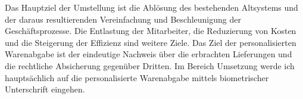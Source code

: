 Das Hauptziel der Umstellung ist die Ablösung des bestehenden Altsystems und der daraus resultierenden Vereinfachung und Beschleunigung der Geschäftsprozesse. Die Entlastung der Mitarbeiter, die Reduzierung von Kosten und die Steigerung der Effizienz sind weitere Ziele. Das Ziel der personalisierten Warenabgabe ist der eindeutige Nachweis über die erbrachten Lieferungen und die rechtliche Absicherung gegenüber Dritten. Im Bereich Umsetzung werde ich hauptsächlich auf die personalisierte Warenabgabe mittels biometrischer Unterschrift eingehen. \cite{einleitung1}